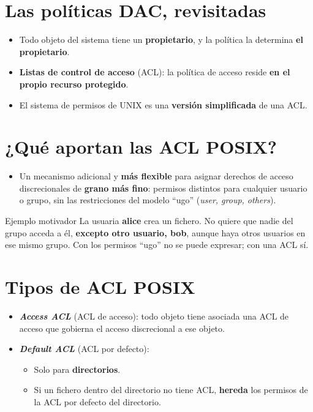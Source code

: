 \documentclass[11pt,a4paper]{report}
\begin{document}
\section{Las políticas DAC, revisitadas}
 
\begin{itemize}
  \item Todo objeto del sistema tiene un \textbf{propietario}, y la política la determina \textbf{el propietario}.
  \item \textbf{Listas de control de acceso} (ACL): la política de acceso reside \textbf{en el propio recurso protegido}.
  \item El sistema de permisos de UNIX es una \textbf{versión simplificada} de una ACL.
\end{itemize}
 
\section{¿Qué aportan las ACL POSIX?}
 
\begin{itemize}
  \item Un mecanismo adicional y \textbf{más flexible} para asignar derechos de acceso discrecionales de \textbf{grano más fino}: permisos distintos para cualquier usuario o grupo, sin las restricciones del modelo ``ugo'' (\emph{user, group, others}).
\end{itemize}
 
\begin{ejemplo}{Ejemplo motivador}
La usuaria \textbf{alice} crea un fichero. No quiere que nadie del grupo acceda a él, \textbf{excepto otro usuario, bob}, aunque haya otros usuarios en ese mismo grupo. Con los permisos ``ugo'' no se puede expresar; con una ACL sí.
\end{ejemplo}
 
\section{Tipos de ACL POSIX}
 
\begin{itemize}
  \item \textbf{\emph{Access ACL}} (ACL de acceso): todo objeto tiene asociada una ACL de acceso que gobierna el acceso discrecional a ese objeto.
  \item \textbf{\emph{Default ACL}} (ACL por defecto):
    \begin{itemize}
      \item Solo para \textbf{directorios}.
      \item Si un fichero dentro del directorio no tiene ACL, \textbf{hereda} los permisos de la ACL por defecto del directorio.
    \end{itemize}
\end{itemize}
 
\end{document}
